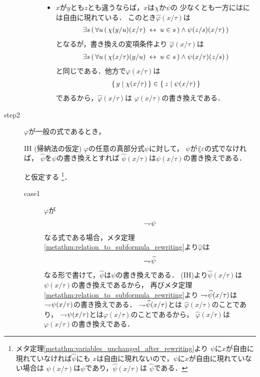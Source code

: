 \begin{metaprf}
\begin{description}
\begin{description}
\begin{itemize}
							\item $x$が$y$とも$z$とも違うならば，$x$は$\chi$か$\psi$の
								少なくとも一方にはには自由に現れている．
								このとき$\widehat{\varphi}(x/\tau)$は
								\begin{align}
									\exists s\, (\, \forall u\, (\, \chi(y/u)(x/\tau) \hspace{0.25em}\leftrightarrow\hspace{0.25em} u \in s\, ) \wedge \psi(z/s)(x/\tau)\, )
								\end{align}
								となるが，書き換えの変項条件より
								$\widehat{\varphi}(x/\tau)$は
								\begin{align}
									\exists s\, (\, \forall u\, (\, \chi(x/\tau)(y/u) \hspace{0.25em}\leftrightarrow\hspace{0.25em} u \in s\, ) \wedge \psi(x/\tau)(z/s)\, )
								\end{align}
								と同じである．他方で$\varphi(x/\tau)$は
								\begin{align}
									\{\, y \mid \chi(x/\tau)\, \} \in \{\, z \mid \psi(x/\tau)\, \}
								\end{align}
								であるから，$\widehat{\varphi}(x/\tau)$は
								$\varphi(x/\tau)$の書き換えである．
						\end{itemize}
				\end{description}
			
			\item[step2] $\varphi$が一般の式であるとき，
				\begin{itembox}[l]{IH (帰納法の仮定)}
					$\varphi$の任意の真部分式$\psi$に対して，
					$\psi$が$\lang{\varepsilon}$の式でなければ，
					$\widehat{\psi}$を$\psi$の書き換えとすれば
					$\widehat{\psi}(x/\tau)$は$\psi(x/\tau)$の書き換えである．
				\end{itembox}
				と仮定する
				\footnote{
					メタ定理\ref{metathm:variables_unchanged_after_rewriting}より
					$\psi$に$x$が自由に現れていなければ$\widehat{\psi}$にも
					$x$は自由に現れないので，$\psi$に$x$が自由に現れていない場合は
					$\psi(x/\tau)$は$\psi$であり，$\widehat{\psi}(x/\tau)$は
					$\widehat{\psi}$である．
				}．
				
				\begin{description}
					\item[case1] $\varphi$が
						\begin{align}
							\rightharpoondown\hspace{-0.25em} \psi
						\end{align}
						なる式である場合，メタ定理\ref{metathm:relation_to_subformula_rewriting}より$\widehat{\varphi}$は
						\begin{align}
							\rightharpoondown\hspace{-0.25em} \widehat{\psi}
						\end{align}
						なる形で書けて，$\widehat{\psi}$は$\psi$の書き換えである．
						(IH)より$\widehat{\psi}(x/\tau)$は
						$\psi(x/\tau)$の書き換えであるから，
						再びメタ定理\ref{metathm:relation_to_subformula_rewriting}より
						$\rightharpoondown\hspace{-0.25em} \widehat{\psi}(x/\tau)$は
						$\rightharpoondown\hspace{-0.25em} \psi(x/\tau)$の書き換えである．
						$\rightharpoondown\hspace{-0.25em} \widehat{\psi}(x/\tau)$とは
						$\widehat{\varphi}(x/\tau)$のことであり，
						$\rightharpoondown\hspace{-0.25em} \psi(x/\tau)$とは$\varphi(x/\tau)$のことであるから，
						$\widehat{\varphi}(x/\tau)$は$\varphi(x/\tau)$の書き換えである．
					

\end{description}
\end{description}
\end{metaprf}

